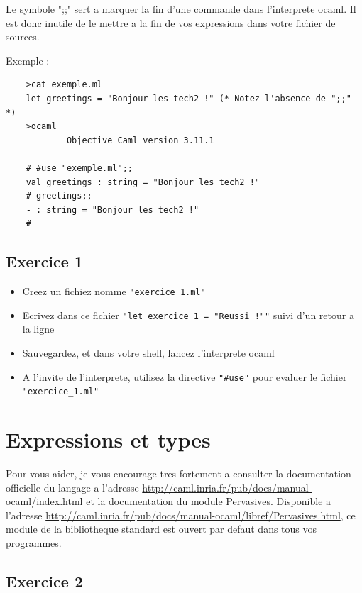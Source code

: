 \documentclass{life-fr}
\begin{document}
  \hint
  {
    Le symbole ";;" sert a marquer la fin d'une commande dans l'interprete
    ocaml. Il est donc inutile de le mettre a la fin de vos expressions dans
    votre fichier de sources.
  }

  Exemple :

  \begin{lstlisting}
    >cat exemple.ml
    let greetings = "Bonjour les tech2 !" (* Notez l'absence de ";;" *)
    >ocaml
            Objective Caml version 3.11.1

    # #use "exemple.ml";;
    val greetings : string = "Bonjour les tech2 !"
    # greetings;;
    - : string = "Bonjour les tech2 !"
    #
  \end{lstlisting}


  \section{Exercice 1}

  \begin{itemize}
    \item Creez un fichiez nomme \texttt{"exercice\_1.ml"}
    \item Ecrivez dans ce fichier \texttt{"let exercice\_1 = "Reussi !""} suivi
      d'un retour a la ligne
    \item Sauvegardez, et dans votre shell, lancez l'interprete ocaml
    \item A l'invite de l'interprete, utilisez la directive \texttt{"\#use"}
      pour evaluer le fichier \texttt{"exercice\_1.ml"}
  \end{itemize}

\chapter{Expressions et types}

    Pour vous aider, je vous encourage tres fortement a consulter la
  documentation officielle du langage a l'adresse
  \url{http://caml.inria.fr/pub/docs/manual-ocaml/index.html} et la
  documentation du module Pervasives. Disponible a l'adresse
  \url{http://caml.inria.fr/pub/docs/manual-ocaml/libref/Pervasives.html}, ce
  module de la bibliotheque standard est ouvert par defaut dans tous vos
  programmes.


  \section{Exercice 2}
\end{document}
